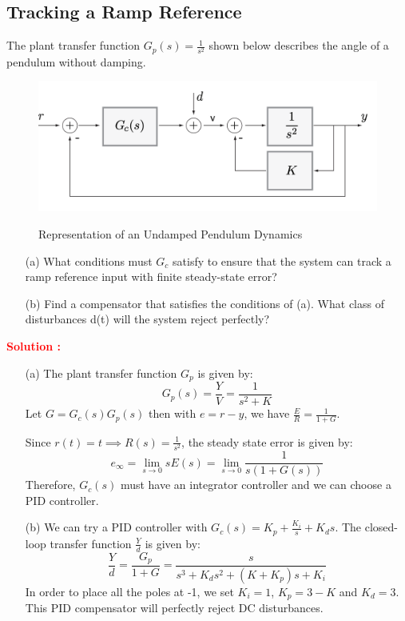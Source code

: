 \documentclass[12pt]{article}
\begin{document}
\subsection{Tracking a Ramp Reference}
The plant transfer function $G_p(s) = \frac{1}{s^2}$ shown below describes the angle of a pendulum without damping.
\begin{figure}[h!]
    \centering
    \includegraphics[width=0.75\linewidth]{figs/4.4.png}
    \label{fig:prb39}
    \caption{Representation of an Undamped Pendulum Dynamics}
\end{figure}
\begin{itemize}
    \item [(a)] What conditions must $G_c$ satisfy to ensure that the system can track a ramp reference input with finite steady-state error?
    \item[(b)] Find a compensator that satisfies the conditions of (a). What class of disturbances d(t) will the system reject perfectly?
\end{itemize}
\textbf{\textcolor{red}{Solution :}} \\
\begin{itemize}
    \item [(a)] The plant transfer function $G_p$ is given by:
    \[
    G_p(s)=\frac{Y}{V}=\frac{1}{s^2+K}
    \]
Let $G=G_c(s)G_p(s)$ then with $e=r-y$, we have $ \frac{E}{R}=\frac{1}{1+G}$.


Since $r(t)=t \implies R(s)=\frac{1}{s^2}$, the steady state error is given by:
\[
e_\infty=\lim_{s \rightarrow 0} s E(s)=\lim_{s \rightarrow 0} \frac{1}{s (1+G(s))}
\]
Therefore, $G_c(s)$ must have an integrator controller and we can choose a PID controller.
    \item[(b)] We can try a PID controller with $G_c(s)=K_p + \frac{K_i}{s} + K_d s$. The closed-loop transfer function $\frac{Y}{d}$ is given by:
    \[
    \frac{Y}{d}=\frac{G_p}{1+G} = \frac{s}{s^3+K_d s^2+ (K+K_p) s+K_i}
    \]
    In order to place all the poles at -1, we set $K_i=1$, $K_p=3-K$ and $K_d=3$. This PID compensator will perfectly reject DC disturbances. 
\end{itemize}
\clearpage
\end{document}
